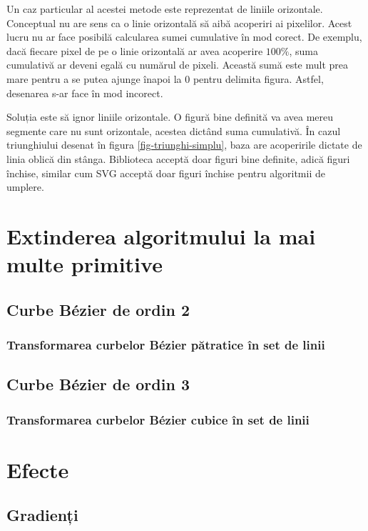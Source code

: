 \documentclass[a4paper, 12pt]{report}
\begin{document}
Un caz particular al acestei metode este reprezentat de liniile orizontale. Conceptual nu are sens ca o linie
orizontală să aibă acoperiri ai pixelilor. Acest lucru nu ar face posibilă calcularea sumei cumulative în mod corect.
De exemplu, dacă fiecare pixel de pe o linie orizontală ar avea acoperire \(100\%\), suma cumulativă ar deveni egală
cu numărul de pixeli. Această sumă este mult prea mare pentru a se putea ajunge înapoi la 0 pentru delimita figura.
Astfel, desenarea s-ar face în mod incorect.

Soluția este să ignor liniile orizontale. O figură bine definită va avea mereu segmente care nu sunt orizontale,
acestea dictând suma cumulativă. În cazul triunghiului desenat în figura \ref{fig-triunghi-simplu}, baza are acoperirile
dictate de linia oblică din stânga. Biblioteca acceptă doar figuri bine definite, adică figuri închise, similar cum SVG
acceptă doar figuri închise pentru algoritmii de umplere.

\chapter{Extinderea algoritmului la mai multe primitive}

\section{Curbe Bézier de ordin 2}

\subsection{Transformarea curbelor Bézier pătratice în set de linii}

\section{Curbe Bézier de ordin 3}

\subsection{Transformarea curbelor Bézier cubice în set de linii}

\chapter{Efecte}

\section{Gradienți}
\end{document}
